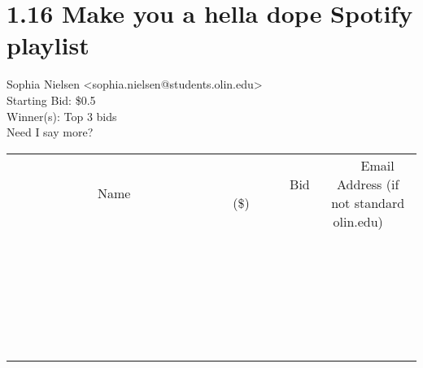 \documentclass[11pt]{article}
\begin{document}
					\section*{1.16 Make you a hella dope Spotify playlist}
					Sophia Nielsen <sophia.nielsen@students.olin.edu> \\
					Starting Bid: \$0.5 \\
					Winner(s): Top 3 bids \\
					Need I say more? \\
					[6ex]
					\begin{tabular}{c c c}
						~~~~~~~~~~~~~Name~~~~~~~~~~~~~ & ~~~~~~~~~Bid (\$)~~~~~~~~~ & ~~~Email Address (if not standard olin.edu)~~~ \\
				
 & & \\
\hline
 & & \\
\hline
 & & \\
\hline
 & & \\
\hline
 & & \\
\hline
 & & \\
\hline
 & & \\
\hline
 & & \\
\hline
 & & \\
\hline
 & & \\
\hline
 & & \\
\hline
 & & \\
\hline
 & & \\
\hline
 & & \\
\hline
 & & \\
\hline
 & & \\
\hline
 & & \\
\hline
 & & \\
\hline
 & & \\
\hline
 & & \\
\hline
 & & \\
\hline
 & & \\
\hline
 & & \\
\hline
 & & \\
\hline
 & & \\
\hline
 & & \\
\hline
					\end{tabular}
					\clearpage
				
\end{document}
